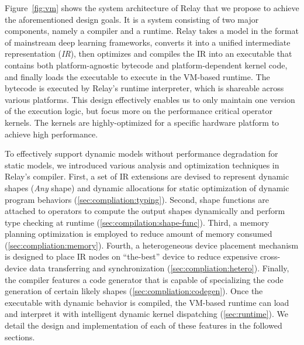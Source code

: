 Figure~\ref{fig:vm} shows the system architecture of Relay that we propose to achieve the aforementioned design goals.
It is a system consisting of two major components, namely a compiler and a runtime.
Relay takes a model in the format of mainstream deep learning frameworks, converts it into a unified intermediate representation (\textit{IR}), then optimizes and compiles the IR into an executable that contains both platform-agnostic bytecode and platform-dependent kernel code, and finally loads the executable to execute in the VM-based runtime.
The bytecode is executed by Relay's runtime interpreter, which is shareable across various platforms.
This design effectively enables us to only maintain one version of the execution logic, but focus more on the performance critical operator kernels.
The kernels are highly-optimized for a specific hardware platform to achieve high performance.

To effectively support dynamic models without performance degradation for static models, we introduced various analysis and optimization techniques in Relay's compiler.
First, a set of IR extensions are devised to represent dynamic shapes (\textit{Any} shape) and dynamic allocations for static optimization of dynamic program behaviors (\autoref{sec:compliation:typing}).
Second, shape functions are attached to operators to compute the output shapes dynamically and perform type checking at runtime (\autoref{sec:compilation:shape-func}).
Third, a memory planning optimization is employed to reduce amount of memory consumed (\autoref{sec:compliation:memory}).
Fourth, a heterogeneous device placement mechanism is designed to place IR nodes on ``the-best'' device to reduce expensive cross-device data transferring and synchronization (\autoref{sec:compliation:hetero}).
Finally, the compiler features a code generator that is capable of specializing the code generation of certain likely shapes (\autoref{sec:compliation:codegen}). Once the executable with dynamic behavior is compiled, the VM-based runtime can load and interpret it with intelligent dynamic kernel dispatching (\autoref{sec:runtime}). We detail the design and implementation of each of these features in the followed sections.

